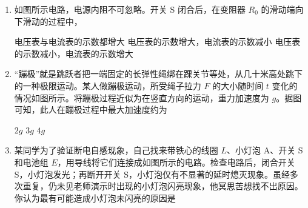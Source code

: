 \documentclass[\gkver]{gaokaozhenti}
\begin{document}
\begin{enumerate}
{它的振动方向一定垂直于波的传播方向}
{它在一个周期内走过的路程等于一个波长}
{它的振动频率等于波源的振动频率}

\item
如图所示电路，电源内阻不可忽略。开关 S 闭合后，在变阻器 $R_{0}$ 的滑动端向下滑动的过程中，


{电压表与电流表的示数都增大}
{电压表的示数增大，电流表的示数减小}
{电压表的示数减小，电流表的示数增大}

\item
“蹦极”就是跳跃者把一端固定的长弹性绳绑在踝关节等处，从几十米高处跳下的一种极限运动。某人做蹦极运动，所受绳子拉力 $F$ 的大小随时间 $t$ 变化的情况如图所示。将蹦极过程近似为在竖直方向的运动，重力加速度为 $g$。据图可知，此人在蹦极过程中最大加速度约为


{$2g$}
{$3g$}
{$4g$}

\item
某同学为了验证断电自感现象，自己找来带铁心的线圈 $L$、小灯泡 A、开关 S 和电池组 $E$，用导线将它们连接成如图所示的电路。检查电路后，闭合开关 S，小灯泡发光；再断开开关 S，小灯泡仅有不显著的延时熄灭现象。虽经多次重复，仍未见老师演示时出现的小灯泡闪亮现象，他冥思苦想找不出原因。你认为最有可能造成小灯泡未闪亮的原因是


\end{enumerate}
\end{document}
